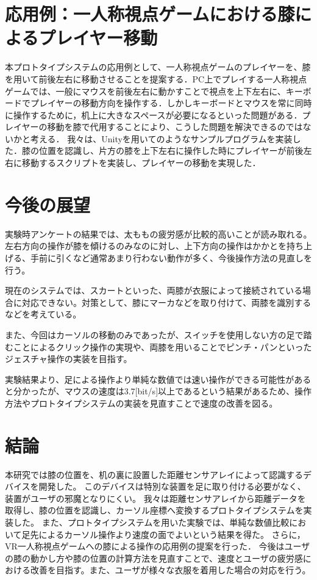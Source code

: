 \documentclass[submit, techrep]{ipsj}
\begin{document}
\section{応用例：一人称視点ゲームにおける膝によるプレイヤー移動}
本プロトタイプシステムの応用例として、一人称視点ゲームのプレイヤーを、膝を用いて前後左右に移動させることを提案する．PC上でプレイする一人称視点ゲームでは、一般にマウスを前後左右に動かすことで視点を上下左右に、キーボードでプレイヤーの移動方向を操作する．しかしキーボードとマウスを常に同時に操作するために，机上に大きなスペースが必要になるといった問題がある．プレイヤーの移動を膝で代用することにより、こうした問題を解決できるのではないかと考える．
我々は、Unityを用いてのようなサンプルプログラムを実装した．膝の位置を認識し、片方の膝を上下左右に操作した時にプレイヤーが前後左右に移動するスクリプトを実装し、プレイヤーの移動を実現した．

\section{今後の展望}
実験時アンケートの結果では、太ももの疲労感が比較的高いことが読み取れる。左右方向の操作が膝を傾けるのみなのに対し、上下方向の操作はかかとを持ち上げる、手前に引くなど通常あまり行わない動作が多く、今後操作方法の見直しを行う。\par
現在のシステムでは、スカートといった、両膝が衣服によって接続されている場合に対応できない。対策として、膝にマーカなどを取り付けて、両膝を識別するなどを考えている。\par
また、今回はカーソルの移動のみであったが、スイッチを使用しない方の足で踏むことによるクリック操作の実現や、両膝を用いることでピンチ・パンといったジェスチャ操作の実装を目指す。\par
実験結果より、足による操作より単純な数値では速い操作ができる可能性があると分かったが、マウスの速度は3.7[bit/s]以上\cite{Soukoreff:2004:TSP:1056153.1056155}であるという結果があるため、操作方法やプロトタイプシステムの実装を見直すことで速度の改善を図る。

\section{結論}
本研究では膝の位置を、机の裏に設置した距離センサアレイによって認識するデバイスを開発した。
このデバイスは特別な装置を足に取り付ける必要がなく、装置がユーザの邪魔となりにくい。
我々は距離センサアレイから距離データを取得し、膝の位置を認識し、カーソル座標へ変換するプロトタイプシステムを実装した。
また、プロトタイプシステムを用いた実験では、単純な数値比較において足先によるカーソル操作より速度の面でよいという結果を得た。
さらに，VR一人称視点ゲームへの膝による操作の応用例の提案を行った．
今後はユーザの膝の動かし方や膝の位置の計算方法を見直すことで、速度とユーザの疲労感における改善を目指す。また、ユーザが様々な衣服を着用した場合の対応を行う。
\end{document}

